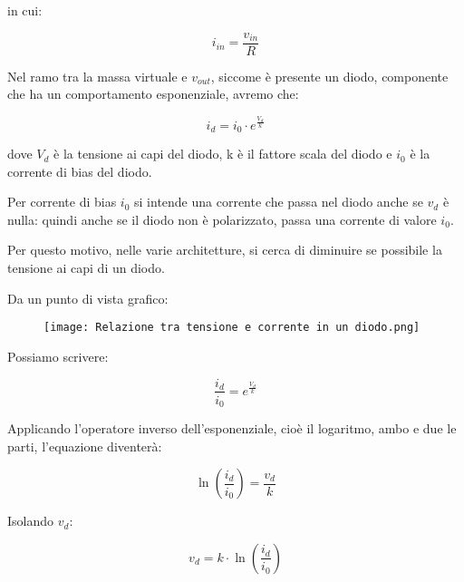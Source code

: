 in cui: 

{
    \Large 
    \begin{equation}
        i_{in}
        = 
        \frac{v_{in}}{R}
    \end{equation}
}

Nel ramo tra la massa virtuale e $v_{out}$, 
siccome è presente un diodo, componente che ha un comportamento esponenziale, 
avremo che: 

{
    \Large 
    \begin{equation}
        i_d 
        = 
        i_0 \cdot e^{\frac{V_d}{k}}
    \end{equation}
}

dove $V_d$ è la tensione ai capi del diodo, k è il fattore scala del diodo e $i_0$ è la corrente di bias del diodo. \newline 

Per corrente di bias $i_0$ si intende una corrente che passa nel diodo anche se $v_d$ è nulla: quindi anche se il diodo non è polarizzato, passa una corrente di valore $i_0$. \newline 

Per questo motivo, nelle varie architetture, si cerca di diminuire se possibile la tensione ai capi di un diodo. \newline 

\newpage 

Da un punto di vista grafico: 

\begin{figure}[h]
    \centering
    \texttt{[image: Relazione tra tensione e corrente in un diodo.png]}
\end{figure}

Possiamo scrivere: 

{
    \Large 
    \begin{equation}
        \frac{i_d}{i_0}
        = 
        e^{\frac{V_d}{k}}
    \end{equation}
}

Applicando l'operatore inverso dell'esponenziale, cioè il logaritmo, ambo e due le parti, 
l'equazione diventerà: 

{
    \Large 
    \begin{equation}
        \ln(\frac{i_d}{i_0}) 
        = 
        \frac{v_d}{k}
    \end{equation}
}

Isolando $v_d$: 

{
    \Large 
    \begin{equation}
        v_d = k \cdot \ln(\frac{i_d}{i_0})
    \end{equation}
}

